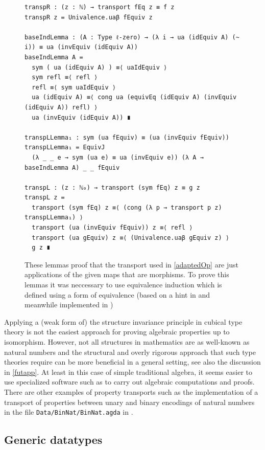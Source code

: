 \documentclass[12pt,a4paper,twoside,xetex]{book} %
\begin{document}
\begin{figure}\label{leftrighttransp}
 \begin{center}
  \begin{BVerbatim}
transpR : (z : ℕ) → transport fEq z ≡ f z
transpR z = Univalence.uaβ fEquiv z

baseIndLemma : (A : Type ℓ-zero) → (λ i → ua (idEquiv A) (~ i)) ≡ ua (invEquiv (idEquiv A))
baseIndLemma A = 
  sym ( ua (idEquiv A) ) ≡⟨ uaIdEquiv ⟩
  sym refl ≡⟨ refl ⟩
  refl ≡⟨ sym uaIdEquiv ⟩
  ua (idEquiv A) ≡⟨ cong ua (equivEq (idEquiv A) (invEquiv (idEquiv A)) refl) ⟩
  ua (invEquiv (idEquiv A)) ∎

transpLLemma₁ : sym (ua fEquiv) ≡ (ua (invEquiv fEquiv))
transpLLemma₁ = EquivJ
  (λ _ _ e → sym (ua e) ≡ ua (invEquiv e)) (λ A → baseIndLemma A) _ _ fEquiv 

transpL : (z : ℕ₀) → transport (sym fEq) z ≡ g z
transpL z =
  transport (sym fEq) z ≡⟨ (cong (λ p → transport p z) transpLLemma₁) ⟩
  transport (ua (invEquiv fEquiv)) z ≡⟨ refl ⟩
  transport (ua gEquiv) z ≡⟨ (Univalence.uaβ gEquiv z) ⟩
  g z ∎
  \end{BVerbatim}

 \end{center}
\caption{These lemmas proof that the transport used in \cref{adaptedOp} are just applications of the given maps that are morphisms. To prove this lemmas it was neccessary to use equivalence induction which is defined using a form of equivalence (based on a hint in \cite{Vez19} and meanwhile implemented in \cite{Moertberg2018})}
\end{figure}


Applying a (weak form of) the structure invariance principle in cubical type theory is not the easiest approach for proving algebraic properties up to isomorphism. However, not all structures in mathematics are as well-known as natural numbers and the structural and overly 
rigorous approach that such type theories require can be more beneficial in a 
general setting, see also the discussion in \cref{futapp}.  At least in this case of simple traditional algebra, it seems 
easier to use specialized software such as \cite{TheGAPGroup2018} to carry out 
algebraic computations and proofs. There are other examples of property transports such as the implementation of a transport of properties between unary and binary encodings of natural numbers in the file \texttt{Data/BinNat/BinNat.agda} in \cite{Moertberg2018}.


\subsection{Generic datatypes}
\end{document}
